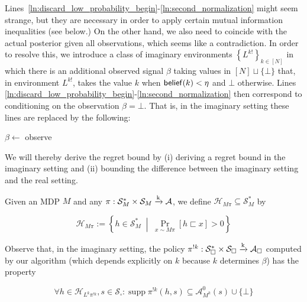 \documentclass[anon,12pt]{colt2018} %
\DeclareMathOperator{\Supp}{supp}
\newcommand{\AP}[1]{\left(#1\right)}
\newcommand{\AB}[1]{\left[#1\right]}
\newcommand{\AC}[1]{\left\{#1\right\}}
\newcommand{\ACM}[2]{\left\{#1\;\middle\vert\;#2\right\}}
\newcommand{\Pa}[2]{\underset{#1}{\operatorname{Pr}}\AB{#2}}
\newcommand{\K}{\xrightarrow{\textnormal{k}}}
\newcommand{\A}{\mathcal{A}}
\newcommand{\St}{\mathcal{S}}
\newcommand{\FH}{\mathcal{H}}
\newcommand{\Rev}{\beta}
\newcommand{\IP}{\pi^{!k}}
\begin{document}
Lines~\ref{ln:discard_low_probability_begin}-\ref{ln:second_normalization} might seem strange, but they are necessary in order to apply certain mutual information inequalities (see below.) On the other hand, we also need \Z to coincide with the actual posterior given all observations, which seems like a contradiction. In order to resolve this, we introduce a class of imaginary environments $\AC{L^{k!}}_{k\in[N]}$ in which there is an additional observed signal $\Rev$ taking values in $[N]\sqcup\{\bot\}$ that, in environment $L^{k!}$, takes the value $k$ when $\DataSty{belief}(k) < \eta$ and $\bot$ otherwise. Lines \ref{ln:discard_low_probability_begin}-\ref{ln:second_normalization} then correspond to conditioning \Z on the observation $\beta=\bot$. That is, in the imaginary setting these lines are replaced by the following:

\begin{algorithm}[h]

\setcounter{AlgoLine}{32}

$\beta\leftarrow$ observe

\eIf{$\beta = \bot$}{
        \For{$k=0$ \KwTo $N-1$}{
                \If{$\Z(k) < \eta$}{
                        $\Z(k) \leftarrow 0$\label{ln:beta__discard}
                }
        }
        \Z$\leftarrow\AP{\sum_{k=0}^{N-1}\Z(k)}^{-1}\cdot\Z$\;
}{
        \Z$ \leftarrow \boldsymbol{0}$\;
        $\Z(\beta) \leftarrow 1$\;
}

\end{algorithm}

We will thereby derive the regret bound by (i) deriving a regret bound in the imaginary setting and (ii) bounding the difference between the imaginary setting and the real setting.

Given an MDP $M$ and any $\pi: \St_M^* \times \St_M \K \A$, we define $\FH_{M\pi} \subseteq \St_M^*$ by

\begin{equation}
\FH_{M\pi} := \ACM{h \in \St_M^*}{\Pa{x\sim M\pi}{h \sqsubset x} > 0}
\end{equation}

Observe that, in the imaginary setting, the policy $\IP: \St_\square^* \times \St_\square \K \A_\square$ computed by our algorithm (which depends explicitly on $k$ because $k$ determines $\beta$) has the property

\begin{equation}
\forall h\in\FH_{L^k\pi^{!k}},s\in\St_\square: \Supp{\IP(h,s)} \subseteq \A_{M^k}^0(s)\cup\{\bot\}
\end{equation}
\end{document}
